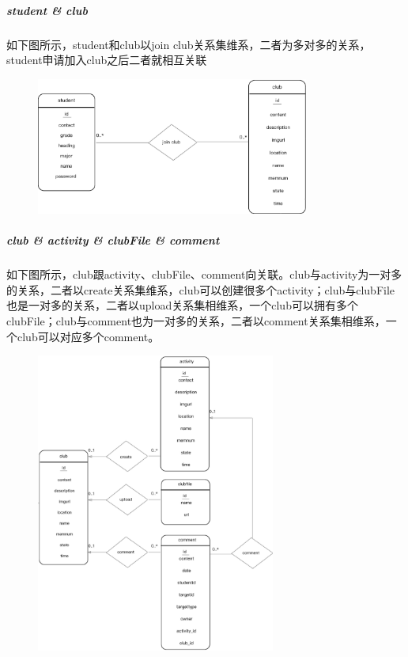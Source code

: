 \documentclass[UTF8]{ctexart}
\begin{document}
\subparagraph{student \& club}
如下图所示，student和club以join club关系集维系，二者为多对多的关系，student申请加入club之后二者就相互关联
\newline
\begin{figure}[H]
\centering
\includegraphics[width = 0.8\textwidth]{student-club-er.eps}
\end{figure}

\subparagraph{club \& activity \& clubFile \& comment}
如下图所示，club跟activity、clubFile、comment向关联。club与activity为一对多的关系，二者以create关系集维系，club可以创建很多个activity；club与clubFile也是一对多的关系，二者以upload关系集相维系，一个club可以拥有多个clubFile；club与comment也为一对多的关系，二者以comment关系集相维系，一个club可以对应多个comment。
\newline
\begin{figure}[H]
\centering
\includegraphics[width = 0.7\textwidth]{club-*-er.eps}
\end{figure}
\end{document}
